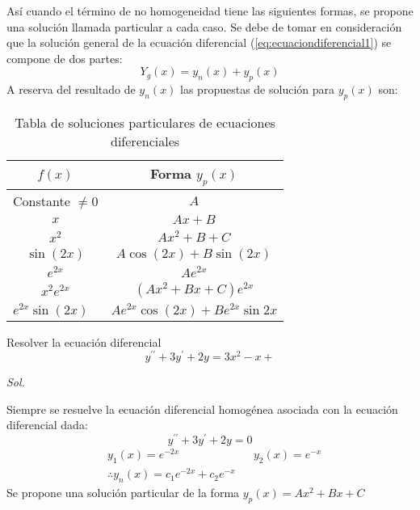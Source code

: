 Así cuando el término de no homogeneidad tiene las siguientes formas, se propone una solución llamada particular a cada caso. Se debe de tomar en consideración que la solución general de la ecuación diferencial (\eqref{eq:ecuaciondiferencial1}) se compone de dos partes:
\begin{equation*}
    Y_g(x) = y_n(x) + y_p(x)
\end{equation*}
A reserva del resultado de $y_n(x)$ las propuestas de solución para $y_p(x)$ son:
\begin{table}[h!]\centering
    \begin{tabular}{@{}cc@{}}
    \toprule
    $f(x)$                                 & Forma $y_p(x)$                                            \\ \midrule
    Constante $\neq 0$                     & $A$                                                         \\
    $x$                                    & $Ax+B$                                                    \\
    $x^2$                                  & $Ax^2+B+C$                                                \\
    $\sin{(2x)}$                           & $A\cos{(2x)}+B\sin{(2x)}$                                 \\
    $e^{2x}$                               & $Ae^{2x}$                                                 \\
    $x^2e^{2x}$                            & $\left(Ax^2 + Bx + C\right)e^{2x}$                        \\
    \multicolumn{1}{l}{$e^{2x}\sin{(2x)}$} & \multicolumn{1}{l}{$Ae^{2x}\cos{(2x)} + Be^{2x}\sin{2x}$} \\ \bottomrule
    \end{tabular}
    \caption{Tabla de soluciones particulares de ecuaciones diferenciales}
    \label{tabed1}
\end{table}

\begin{example}
    Resolver la ecuación diferencial 
    \begin{equation*}
        y^{\prime\prime} + 3y^{\prime} + 2y = 3x^2 - x +
    \end{equation*}
\end{example}

\textit{ Sol. }

Siempre se resuelve la ecuación diferencial homogénea asociada con la ecuación diferencial dada:
\begin{equation*}
    y^{\prime\prime} + 3y^{\prime} + 2y = 0
\end{equation*}
\begin{align*}
    &y_1(x) = e^{-2x}&& y_2(x) = e^{-x}\\
    &\therefore y_n(x) = c_1e^{ - 2x} +c_2e^{ - x}
\end{align*}
Se propone una solución particular de la forma $y_p(x)=Ax^2+Bx+C$

